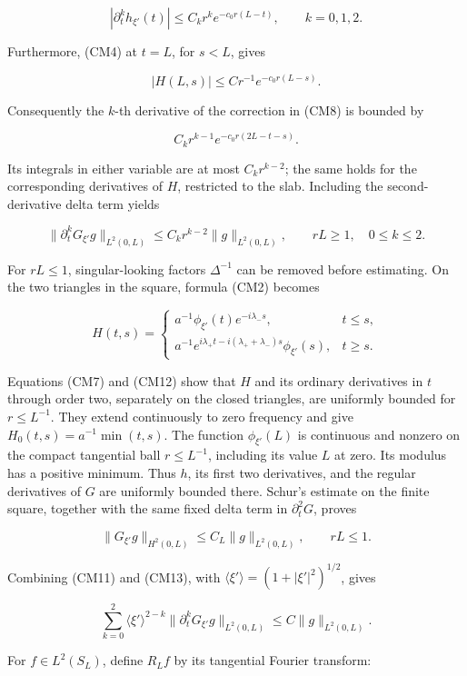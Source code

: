 \documentclass[
  11pt,
]{article}
\begin{document}
\[
|\partial_t^kh_{\xi'}(t)|\leq C_kr^k e^{-c_0r(L-t)},\qquad k=0,1,2.
\]

Furthermore, (CM4) at \(t=L\), for \(s<L\), gives

\[
|H(L,s)|\leq Cr^{-1}e^{-c_0r(L-s)}.
\]

Consequently the \(k\)-th derivative of the correction in (CM8) is
bounded by

\[
C_kr^{k-1}e^{-c_0r(2L-t-s)}.
\]

Its integrals in either variable are at most \(C_kr^{k-2}\); the same
holds for the corresponding derivatives of \(H\), restricted to the
slab. Including the second-derivative delta term yields

\[
\|\partial_t^kG_{\xi'}g\|_{L^2(0,L)}
\leq C_kr^{k-2}\|g\|_{L^2(0,L)},\qquad rL\geq1,\quad 0\leq k\leq2.
\tag{CM11}
\]

For \(rL\leq1\), singular-looking factors \(\Delta^{-1}\) can be removed
before estimating. On the two triangles in the square, formula (CM2)
becomes

\[
H(t,s)=
\begin{cases}
a^{-1}\phi_{\xi'}(t)e^{-i\lambda_-s},&t\leq s,\\
a^{-1}e^{i\lambda_+t-i(\lambda_++\lambda_-)s}\phi_{\xi'}(s),&t\geq s.
\end{cases}
\tag{CM12}
\]

Equations (CM7) and (CM12) show that \(H\) and its ordinary derivatives
in \(t\) through order two, separately on the closed triangles, are
uniformly bounded for \(r\leq L^{-1}\). They extend continuously to zero
frequency and give \(H_0(t,s)=a^{-1}\min(t,s)\). The function
\(\phi_{\xi'}(L)\) is continuous and nonzero on the compact tangential
ball \(r\leq L^{-1}\), including its value \(L\) at zero. Its modulus
has a positive minimum. Thus \(h\), its first two derivatives, and the
regular derivatives of \(G\) are uniformly bounded there. Schur's
estimate on the finite square, together with the same fixed delta term
in \(\partial_t^2G\), proves

\[
\|G_{\xi'}g\|_{H^2(0,L)}\leq C_L\|g\|_{L^2(0,L)},\qquad rL\leq1.
\tag{CM13}
\]

Combining (CM11) and (CM13), with
\(\langle\xi'\rangle=(1+|\xi'|^2)^{1/2}\), gives

\[
\sum_{k=0}^2
\langle\xi'\rangle^{2-k}\|\partial_t^kG_{\xi'}g\|_{L^2(0,L)}
\leq C\|g\|_{L^2(0,L)}.
\tag{CM14}
\]

For \(f\in L^2(S_L)\), define \(R_Lf\) by its tangential Fourier
transform:
\end{document}

